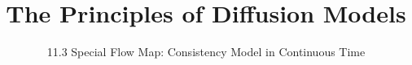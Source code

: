 ﻿%

\title{The Principles of Diffusion Models}
\subtitle{11.3 Special Flow Map: Consistency Model in Continuous Time}


\begin{frame}
    \titlepage
\end{frame}


